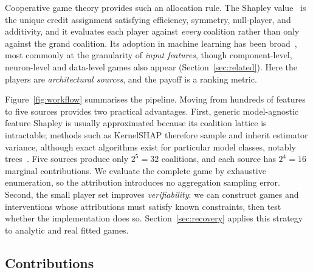 \documentclass[pdflatex,sn-basic,Numbered]{sn-jnl}
\theoremstyle{plain}
\theoremstyle{definition}
\begin{document}
Cooperative game theory provides such an allocation rule. The Shapley
value~\citep{shapley1953} is the unique credit assignment satisfying
efficiency, symmetry, null-player, and additivity, and it evaluates each player
against \emph{every} coalition rather than only against the grand coalition.
Its adoption in machine learning has been broad~\citep{lundberg2017,
covert2021explaining}, most commonly at the granularity of \emph{input
features}, though component-level, neuron-level and data-level games also
appear (Section~\ref{sec:related}). Here the players are \emph{architectural
sources}, and the payoff is a ranking metric.

Figure~\ref{fig:workflow} summarises the pipeline. Moving from hundreds of
features to five sources provides two practical advantages. First, generic
model-agnostic feature Shapley is usually approximated because its coalition
lattice is intractable; methods such as KernelSHAP therefore sample and inherit
estimator variance, although exact algorithms exist for particular model
classes, notably trees~\citep{lundberg2020}. Five sources produce only
$2^5=32$ coalitions, and each source has $2^4=16$ marginal contributions. We
evaluate the complete game by exhaustive enumeration, so the attribution
introduces no aggregation sampling error.
Second, the small player set improves \emph{verifiability}: we can construct
games and interventions whose attributions must satisfy known constraints, then
test whether the implementation does so. Section~\ref{sec:recovery} applies
this strategy to analytic and real fitted games.

\subsection{Contributions}
\end{document}
